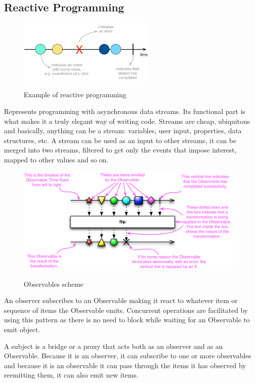 \documentclass[12 pct]{report}
\begin{document}
\subsection*{Reactive Programming}

\begin{figure}[H]
\includegraphics[width=0.6\textwidth]{streams}
\centering
\label{fig:reactive-pgrogramming}
\caption{Example of reactive programming }
\end{figure}

Represents programming with asynchronous data streams. Its functional part is what makes it a truly elegant way of writing code. Streams are cheap, ubiquitous and basically, anything can be a stream: variables, user input, properties, data structures, etc. A stream can be used as an input to other streams, it can be merged into two streams, filtered to get only the events that impose interest, mapped to other values and so on.

\begin{figure}[H]
\includegraphics[width=1.0\textwidth]{observable-doc}
\centering
\label{fig:feature-points}
\caption{ Observables scheme \cite{reactivex} }
\end{figure}

An observer subscribes to an Observable making it react to whatever item or sequence of items the Observable emits. Concurrent operations are facilitated by using this pattern as there is no need to block while waiting for an Observable to emit object.

A subject is a bridge or a proxy that acts both as an observer and as an Observable. Because it is an observer, it can subscribe to one or more observables and because it is an observable it can pass through the items it has observed by reemitting them, it can also emit new items.
\end{document}
